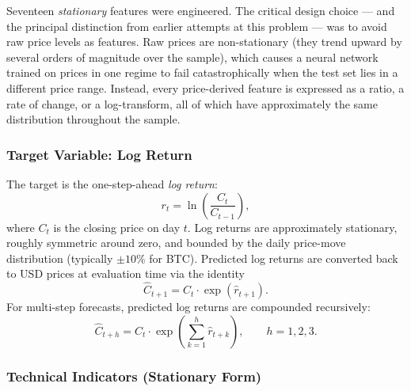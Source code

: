 \documentclass[12pt]{article}
\begin{document}
Seventeen \emph{stationary} features were engineered. The critical design choice --- and the principal distinction from earlier attempts at this problem --- was to avoid raw price levels as features. Raw prices are non-stationary (they trend upward by several orders of magnitude over the sample), which causes a neural network trained on prices in one regime to fail catastrophically when the test set lies in a different price range. Instead, every price-derived feature is expressed as a ratio, a rate of change, or a log-transform, all of which have approximately the same distribution throughout the sample.

\subsubsection{Target Variable: Log Return}

The target is the one-step-ahead \emph{log return}:
\begin{equation}
    r_t = \ln\!\left(\frac{C_t}{C_{t-1}}\right),
\label{eq:log-return}
\end{equation}
where $C_t$ is the closing price on day $t$. Log returns are approximately stationary, roughly symmetric around zero, and bounded by the daily price-move distribution (typically $\pm 10\%$ for BTC). Predicted log returns are converted back to USD prices at evaluation time via the identity
\begin{equation}
    \hat{C}_{t+1} = C_t \cdot \exp(\hat{r}_{t+1}).
\label{eq:price-reconstruction}
\end{equation}
For multi-step forecasts, predicted log returns are compounded recursively:
\begin{equation}
    \hat{C}_{t+h} = C_t \cdot \exp\!\left(\sum_{k=1}^{h}\hat{r}_{t+k}\right),\qquad h=1,2,3.
\label{eq:multistep-reconstruction}
\end{equation}

\subsubsection{Technical Indicators (Stationary Form)}
\end{document}
